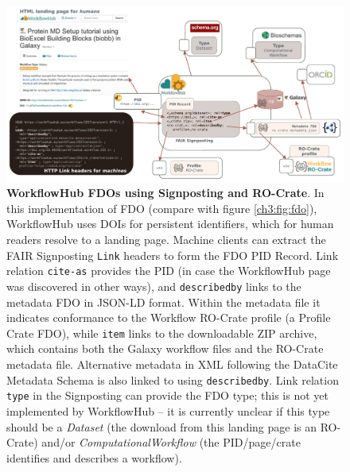 \begin{figure}[htb]
  \includegraphics[width=\textwidth]{figures/ch09/signposting.pdf}
    \caption[WorkflowHub FDOs using Signposting and RO-Crate]{\textbf{WorkflowHub FDOs using Signposting and RO-Crate}. In this implementation of FDO (compare with figure \vref{ch3:fig:fdo}), WorkflowHub uses DOIs for persistent identifiers, which for human readers resolve to a landing page. Machine clients can extract the FAIR Signposting \texttt{Link} headers \cite{Van de Sompel 2022} to form the FDO PID Record. Link relation \texttt{cite-as} provides the PID \cite{Bayarri 2022} (in case the WorkflowHub page was discovered in other ways), and \texttt{describedby} links to the metadata FDO in JSON-LD format. Within the metadata file it indicates conformance to the Workflow RO-Crate profile (a Profile Crate FDO), while \texttt{item} links to the downloadable ZIP archive, which contains both the Galaxy workflow files and the RO-Crate metadata file. Alternative metadata in XML following the DataCite Metadata Schema is also linked to using \texttt{describedby}. Link relation \texttt{type} in the Signposting can provide the FDO type; this is not yet implemented by WorkflowHub -- it is currently unclear if this type should be a \emph{Dataset} (the download from this landing page is an RO-Crate) and/or \emph{ComputationalWorkflow} (the PID/page/crate identifies and describes a workflow).
    }
  \label{ch9:fig:signposting}
\end{figure}
